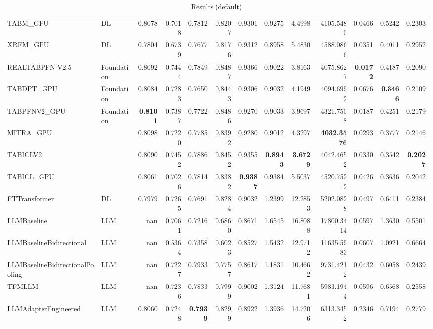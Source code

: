\begin{table}[htbp]
{\begin{tabular}{ll|rrrrrrrrrrr}
TABM\_GPU & DL & 0.8078 & 0.7018 & 0.7812 & 0.8207 & 0.9301 & 0.9275 & 4.4998 & 4105.5480 & 0.0466 & 0.5242 & 0.2303 \\
XRFM\_GPU & DL & 0.7804 & 0.6739 & 0.7677 & 0.8176 & 0.9312 & 0.8958 & 5.4830 & 4588.0866 & 0.0351 & 0.4011 & 0.2952 \\
REALTABPFN-V2.5 & Foundation & 0.8092 & 0.7444 & 0.7849 & 0.8487 & 0.9366 & 0.9022 & 3.8163 & 4075.8627 & \textbf{0.0172} & 0.4187 & 0.2090 \\
TABDPT\_GPU & Foundation & 0.8084 & 0.7283 & 0.7650 & 0.8443 & 0.9306 & 0.9032 & 4.1949 & 4094.6992 & 0.0676 & \textbf{0.3466} & 0.2109 \\
TABPFNV2\_GPU & Foundation & \textbf{0.8101} & 0.7387 & 0.7722 & 0.8486 & 0.9270 & 0.9033 & 3.9697 & 4321.7508 & 0.0187 & 0.4251 & 0.2179 \\
MITRA\_GPU &  & 0.8098 & 0.7220 & 0.7785 & 0.8392 & 0.9280 & 0.9012 & 4.3297 & \textbf{4032.3576} & 0.0293 & 0.3777 & 0.2146 \\
TABICLV2 &  & 0.8090 & 0.7452 & 0.7886 & 0.8452 & 0.9355 & \textbf{0.8943} & \textbf{3.6729} & 4042.4652 & 0.0330 & 0.3542 & \textbf{0.2027} \\
TABICL\_GPU &  & 0.8061 & 0.7026 & 0.7814 & 0.8382 & \textbf{0.9387} & 0.9384 & 5.5037 & 4520.7522 & 0.0426 & 0.3636 & 0.2042 \\
\midrule
FTTransformer & DL & 0.7979 & 0.7265 & 0.7691 & 0.8284 & 0.9032 & 1.2399 & 12.2853 & 5202.0828 & 0.0497 & 0.6411 & 0.2384 \\
LLMBaseline & LLM & nan & 0.7061 & 0.7216 & 0.6860 & 0.8671 & 1.6545 & 16.8088 & 17800.3414 & 0.0597 & 1.3630 & 0.5501 \\
LLMBaselineBidirectional & LLM & nan & 0.5364 & 0.7358 & 0.6023 & 0.8527 & 1.5432 & 12.9712 & 11635.5983 & 0.0607 & 1.0921 & 0.6664 \\
LLMBaselineBidirectionalPooling & LLM & nan & 0.7227 & 0.7933 & 0.7757 & 0.8617 & 1.1831 & 10.4662 & 9731.4212 & 0.0432 & 0.6058 & 0.2439 \\
TFMLLM & LLM & nan & 0.7236 & 0.7833 & 0.7999 & 0.9002 & 1.3124 & 11.7681 & 5983.1944 & 0.0596 & 0.6568 & 0.2558 \\
LLMAdapterEngineered & LLM & 0.8060 & 0.7248 & \textbf{0.7939} & 0.8299 & 0.8922 & 1.3936 & 14.7206 & 6313.3452 & 0.2346 & 0.7194 & 0.2779 \\
\bottomrule
\end{tabular}
}
\caption{Results (default)}
\label{tab:results_default}
\end{table}